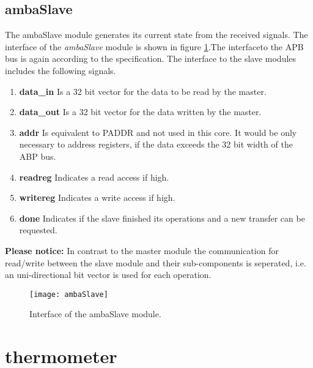 \documentclass[%
	a4paper,
]
{article}
\begin{document}
\subsection{ambaSlave}
The ambaSlave module generates its current state from the received signals. The interface of the \textit{ambaSlave} module is shown in figure \ref{fig:ambaSlave}.The interfaceto the APB bus is again according to the specification. The interface to the slave modules includes the following signals.
\begin{enumerate}
	\item{\textbf{data_in}} Is a 32 bit vector for the data to be read by the master. 
	\item{\textbf{data_out}} Is a 32 bit vector for the data written by the master.
	\item{\textbf{addr}} Is equivalent to PADDR and not used in this core. It would be only necessary to address registers, if the data exceeds the 32 bit width of the ABP bus.
	\item{\textbf{readreg}} Indicates a read access if high.
	\item{\textbf{writereg}} Indicates a write access if high.
	\item{\textbf{done}} Indicates if the slave finished its operations and a new transfer can be requested.
\end{enumerate}
\textbf{Please notice:} In contrast to the master module the communication for read/write between the slave module and their sub-components is seperated, i.e. an uni-directional bit vector is used for each operation.
\begin{figure}[h!]
	\centering
	\texttt{[image: ambaSlave]}
	\caption{Interface of the ambaSlave module.}
	\label{fig:ambaSlave}
\end{figure}

\section{thermometer}
\end{document}
